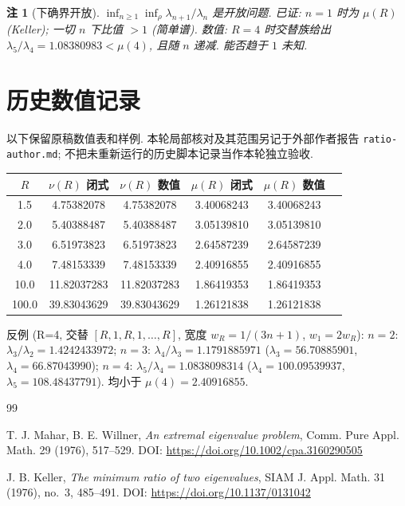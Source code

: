 \documentclass[UTF8]{ctexart}
\newtheorem{remark}[theorem]{注}
\begin{document}
\begin{remark}[下确界开放]
$\inf_{n\geq 1}\inf_{\rho}\lambda_{n+1}/\lambda_n$ 是开放问题.
已证: $n=1$ 时为 $\mu(R)$ (Keller); 一切 $n$ 下比值 $> 1$ (简单谱).
数值: $R=4$ 时交替族给出 $\lambda_5/\lambda_4 = 1.08380983 < \mu(4)$, 且随 $n$ 递减.
能否趋于 $1$ 未知.
\end{remark}

\section{历史数值记录}

以下保留原稿数值表和样例. 本轮局部核对及其范围另记于外部作者报告
\texttt{ratio-author.md}; 不把未重新运行的历史脚本记录当作本轮独立验收.

\begin{center}
\begin{tabular}{cccccc}
	\toprule
	$R$ & $\nu(R)$ 闭式 & $\nu(R)$ 数值 & $\mu(R)$ 闭式 & $\mu(R)$ 数值 \\
	\midrule
	1.5 & 4.75382078 & 4.75382078 & 3.40068243 & 3.40068243 \\
	2.0 & 5.40388487 & 5.40388487 & 3.05139810 & 3.05139810 \\
	3.0 & 6.51973823 & 6.51973823 & 2.64587239 & 2.64587239 \\
	4.0 & 7.48153339 & 7.48153339 & 2.40916855 & 2.40916855 \\
	10.0 & 11.82037283 & 11.82037283 & 1.86419353 & 1.86419353 \\
	100.0 & 39.83043629 & 39.83043629 & 1.26121838 & 1.26121838 \\
	\bottomrule
\end{tabular}
\end{center}

反例 (R=4, 交替 $[R,1,R,1,\dots,R]$, 宽度 $w_R = 1/(3n+1)$, $w_1 = 2w_R$):
$n=2$: $\lambda_3/\lambda_2 = 1.4242433972$; $n=3$: $\lambda_4/\lambda_3 = 1.1791885971$
($\lambda_3 = 56.70885901$, $\lambda_4 = 66.87043990$);
$n=4$: $\lambda_5/\lambda_4 = 1.0838098314$
($\lambda_4 = 100.09539937$, $\lambda_5 = 108.48437791$). 均小于 $\mu(4) = 2.40916855$.

\begin{thebibliography}{99}

 T. J. Mahar, B. E. Willner, \emph{An extremal eigenvalue problem},
	Comm. Pure Appl. Math. 29 (1976), 517--529.
	DOI: \url{https://doi.org/10.1002/cpa.3160290505}

 J. B. Keller, \emph{The minimum ratio of two eigenvalues},
	SIAM J. Appl. Math. 31 (1976), no.~3, 485--491.
	DOI: \url{https://doi.org/10.1137/0131042}

\end{thebibliography}
\end{document}
